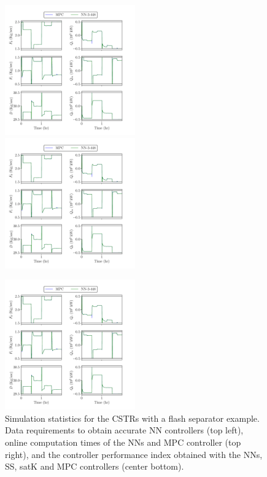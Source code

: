 \documentclass[preprint,5p, twocolumn, authoryear]{elsarticle}
\begin{document}
\begin{figure}[!h]
    \includegraphics[page=21,
        width=0.5\textwidth, 
        height=0.3\textheight]{cstrs_comparision_plots.pdf} \hfill
    \includegraphics[page=23,
        width=0.5\textwidth, 
        height=0.3\textheight]{cstrs_comparision_plots.pdf} \vfill
    \vspace{-0.1in}
    \begin{center}\includegraphics[page=22,
        width=0.5\textwidth, 
        height=0.3\textheight]{cstrs_comparision_plots.pdf}\end{center}
    \vspace{-0.2in}
    \caption{Simulation statistics for the  
    CSTRs with a flash separator example. Data requirements to obtain accurate NN controllers (top left), online computation times of the NNs and 
    MPC controller (top right), 
    and the controller performance index obtained with the NNs, 
    SS, satK and MPC controllers (center bottom).}	
    \label{fig:cstrs_statistics}
\end{figure}
\end{document}
